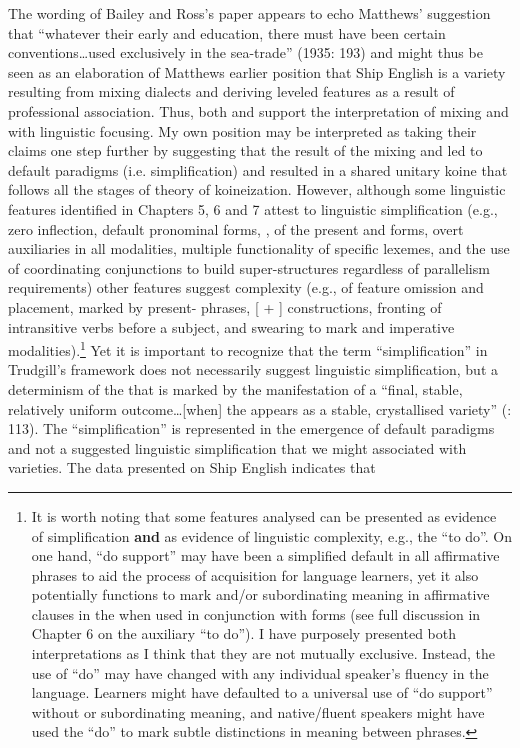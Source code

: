 The wording of Bailey and Ross’s paper appears to echo Matthews’ suggestion that “whatever their early  and education, there must have been certain conventions…used exclusively in the sea-trade” (1935: 193) and might thus be seen as an elaboration of Matthews earlier position that Ship English is a variety resulting from mixing dialects and deriving leveled features as a result of professional association. Thus, both  and \citet{BaileyRoss1988} support the interpretation of mixing and  with linguistic focusing. My own position may be interpreted as taking their claims one step further by suggesting that the result of the mixing and  led to default paradigms (i.e. simplification) and resulted in a shared unitary koine that follows all the stages of  theory of koineization. However, although some linguistic features identified in Chapters 5, 6 and 7 attest to linguistic simplification (e.g., zero inflection, default pronominal forms, ,  of the present and   forms, overt auxiliaries in all modalities, multiple functionality of specific lexemes, and the use of coordinating conjunctions to build super-structures regardless of parallelism requirements) other features suggest complexity (e.g.,  of feature omission and placement,  marked by present- phrases, [ + ] constructions, fronting of intransitive verbs before a  subject, and swearing to mark  and imperative modalities).\footnote{It is worth noting that some features analysed can be presented as evidence of simplification \textbf{and} as evidence of linguistic complexity, e.g., the  “to do”. On one hand, “do support” may have been a simplified default in all affirmative  phrases to aid the process of acquisition for language learners, yet it also potentially functions to mark  and/or subordinating meaning in affirmative clauses in the  when used in conjunction with  forms (see full discussion in Chapter 6 on the auxiliary “to do”). I have purposely presented both interpretations as I think that they are not mutually exclusive. Instead, the use of “do” may have changed with any individual speaker’s fluency in the language. Learners might have defaulted to a universal use of “do support” without  or subordinating meaning, and native/fluent speakers might have used the  “do” to mark subtle distinctions in meaning between  phrases.  } Yet it is important to recognize that the term “simplification” in Trudgill’s framework does not necessarily suggest linguistic simplification, but a determinism of the  that is marked by the manifestation of a “final, stable, relatively uniform outcome…[when] the  appears as a stable, crystallised variety” (\citealt{Trudgill2004}: 113). The “simplification” is represented in the emergence of default paradigms and not a suggested linguistic simplification that we might associated with  varieties. The data presented on Ship English indicates that 